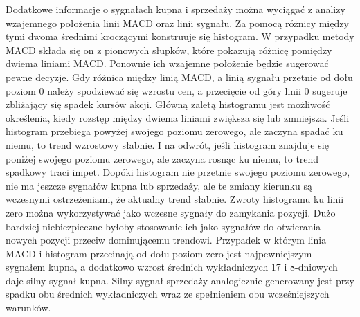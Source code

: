 \documentclass[pdflatex,11pt]{aghdpl}
\begin{document}
Dodatkowe informacje o sygnałach kupna i sprzedaży można wyciągać z analizy wzajemnego położenia linii MACD oraz linii sygnału. Za pomocą różnicy między tymi dwoma średnimi kroczącymi konstruuje się histogram. W przypadku metody MACD składa się on z pionowych słupków, które pokazują różnicę pomiędzy dwiema liniami MACD. Ponownie ich wzajemne położenie będzie sugerować pewne decyzje. Gdy różnica między linią MACD, a linią sygnału przetnie od dołu poziom 0 należy spodziewać się wzrostu cen, a przecięcie od góry linii 0 sugeruje zbliżający się spadek kursów akcji. Główną zaletą histogramu jest możliwość określenia, kiedy rozstęp między dwiema liniami zwiększa się lub zmniejsza. Jeśli histogram przebiega powyżej swojego poziomu zerowego, ale zaczyna spadać ku niemu, to trend wzrostowy słabnie. I na odwrót, jeśli histogram znajduje się poniżej swojego poziomu zerowego, ale zaczyna rosnąc ku niemu, to trend spadkowy traci impet. Dopóki histogram nie przetnie swojego poziomu zerowego, nie ma jeszcze sygnałów kupna lub sprzedaży, ale te zmiany kierunku są wczesnymi ostrzeżeniami, że aktualny trend słabnie. Zwroty histogramu ku linii zero można wykorzystywać jako wczesne sygnały do zamykania pozycji. Dużo bardziej niebiezpieczne byłoby stosowanie ich jako sygnałów do otwierania nowych pozycji przeciw dominującemu trendowi. Przypadek w którym linia MACD i histogram przecinają od dołu poziom zero jest najpewniejszym sygnałem kupna, a dodatkowo wzrost średnich wykładniczych 17 i 8-dniowych daje silny sygnał kupna\cite{1}. Silny sygnał sprzedaży analogicznie generowany jest przy spadku obu średnich wykładniczych wraz ze spełnieniem obu wcześniejszych warunków. 
\end{document}
